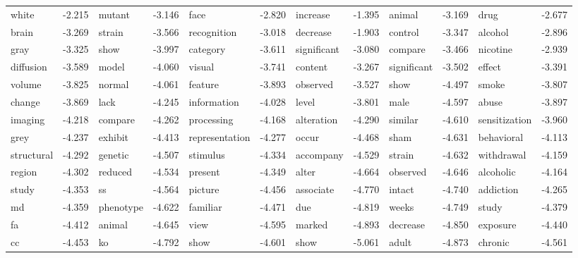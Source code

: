 \documentclass{article}
\begin{document}
\begin{table}
{\begin{tabular}{|l r|l r|l r|l r|l r|l r|}
white & -2.215 & mutant & -3.146 & face & -2.820 & increase & -1.395 & animal & -3.169 & drug & -2.677\\
brain & -3.269 & strain & -3.566 & recognition & -3.018 & decrease & -1.903 & control & -3.347 & alcohol & -2.896\\
gray & -3.325 & show & -3.997 & category & -3.611 & significant & -3.080 & compare & -3.466 & nicotine & -2.939\\
diffusion & -3.589 & model & -4.060 & visual & -3.741 & content & -3.267 & significant & -3.502 & effect & -3.391\\
volume & -3.825 & normal & -4.061 & feature & -3.893 & observed & -3.527 & show & -4.497 & smoke & -3.807\\
change & -3.869 & lack & -4.245 & information & -4.028 & level & -3.801 & male & -4.597 & abuse & -3.897\\
imaging & -4.218 & compare & -4.262 & processing & -4.168 & alteration & -4.290 & similar & -4.610 & sensitization & -3.960\\
grey & -4.237 & exhibit & -4.413 & representation & -4.277 & occur & -4.468 & sham & -4.631 & behavioral & -4.113\\
structural & -4.292 & genetic & -4.507 & stimulus & -4.334 & accompany & -4.529 & strain & -4.632 & withdrawal & -4.159\\
region & -4.302 & reduced & -4.534 & present & -4.349 & alter & -4.664 & observed & -4.646 & alcoholic & -4.164\\
study & -4.353 & ss & -4.564 & picture & -4.456 & associate & -4.770 & intact & -4.740 & addiction & -4.265\\
md & -4.359 & phenotype & -4.622 & familiar & -4.471 & due & -4.819 & weeks & -4.749 & study & -4.379\\
fa & -4.412 & animal & -4.645 & view & -4.595 & marked & -4.893 & decrease & -4.850 & exposure & -4.440\\
cc & -4.453 & ko & -4.792 & show & -4.601 & show & -5.061 & adult & -4.873 & chronic & -4.561\\
\hline
\end{tabular}
}
\end{table}
\end{document}
